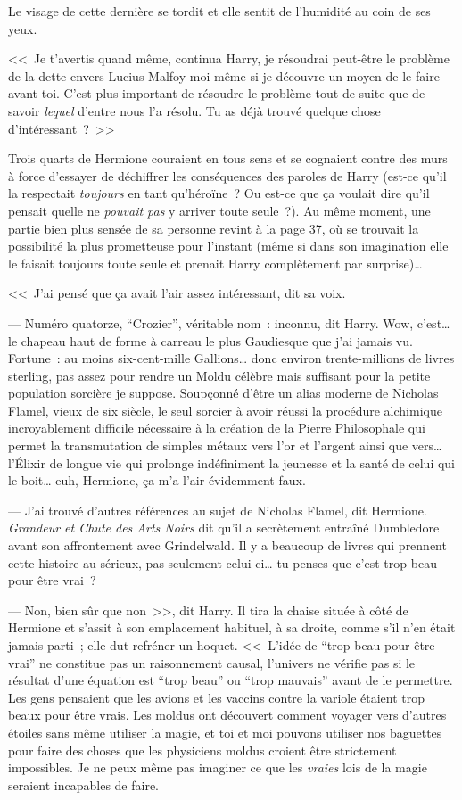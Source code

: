 Le visage de cette dernière se tordit et elle sentit de l'humidité au coin de ses yeux.

<<~Je t'avertis quand même, continua Harry, je résoudrai peut-être le problème de la dette envers Lucius Malfoy moi-même si je découvre un moyen de le faire avant toi. C'est plus important de résoudre le problème tout de suite que de savoir \emph{lequel} d'entre nous l'a résolu. Tu as déjà trouvé quelque chose d'intéressant~?~>>

Trois quarts de Hermione couraient en tous sens et se cognaient contre des murs à force d'essayer de déchiffrer les conséquences des paroles de Harry (est-ce qu'il la respectait \emph{toujours} en tant qu'héroïne~? Ou est-ce que ça voulait dire qu'il pensait quelle ne \emph{pouvait pas} y arriver toute seule~?). Au même moment, une partie bien plus sensée de sa personne revint à la page 37, où se trouvait la possibilité la plus prometteuse pour l'instant (même si dans son imagination elle le faisait toujours toute seule et prenait Harry complètement par surprise)…

<<~J'ai pensé que ça avait l'air assez intéressant, dit sa voix.

--- Numéro quatorze, “Crozier”, véritable nom~: inconnu, dit Harry. Wow, c'est… le chapeau haut de forme à carreau le plus Gaudiesque que j'ai jamais vu. Fortune~: au moins six-cent-mille Gallions… donc environ trente-millions de livres sterling, pas assez pour rendre un Moldu célèbre mais suffisant pour la petite population sorcière je suppose. Soupçonné d'être un alias moderne de Nicholas Flamel, vieux de six siècle, le seul sorcier à avoir réussi la procédure alchimique incroyablement difficile nécessaire à la création de la Pierre Philosophale qui permet la transmutation de simples métaux vers l'or et l'argent ainsi que vers… l'Élixir de longue vie qui prolonge indéfiniment la jeunesse et la santé de celui qui le boit… euh, Hermione, ça m'a l'air évidemment faux.

--- J'ai trouvé d'autres références au sujet de Nicholas Flamel, dit Hermione. \emph{Grandeur et Chute des Arts Noirs} dit qu'il a secrètement entraîné Dumbledore avant son affrontement avec Grindelwald. Il y a beaucoup de livres qui prennent cette histoire au sérieux, pas seulement celui-ci… tu penses que c'est trop beau pour être vrai~?

--- Non, bien sûr que non~>>, dit Harry. Il tira la chaise située à côté de Hermione et s'assit à son emplacement habituel, à sa droite, comme s'il n'en était jamais parti~; elle dut refréner un hoquet. <<~L'idée de “trop beau pour être vrai” ne constitue pas un raisonnement causal, l'univers ne vérifie pas si le résultat d'une équation est “trop beau” ou “trop mauvais” avant de le permettre. Les gens pensaient que les avions et les vaccins contre la variole étaient trop beaux pour être vrais. Les moldus ont découvert comment voyager vers d'autres étoiles sans même utiliser la magie, et toi et moi pouvons utiliser nos baguettes pour faire des choses que les physiciens moldus croient être strictement impossibles. Je ne peux même pas imaginer ce que les \emph{vraies} lois de la magie seraient incapables de faire.

